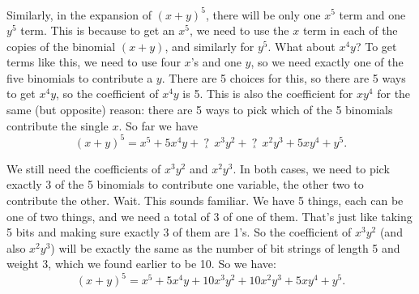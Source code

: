 \documentclass[10pt,]{book}
\theoremstyle{plain}
\theoremstyle{definition}
\theoremstyle{definition}
\theoremstyle{definition}
\numberwithin{equation}{chapter}
\begin{document}
        Similarly, in the expansion of \((x+y)^5\), there will be only one \(x^5\) term and one \(y^5\) term. This is because to get an \(x^5\), we need to use the \(x\) term in each of the copies of the binomial \((x+y)\), and similarly for \(y^5\). What about \(x^4y\)? To get terms like this, we need to use four \(x\)'s and one \(y\), so we need exactly one of the five binomials to contribute a \(y\). There are 5 choices for this, so there are 5 ways to get \(x^4y\), so the coefficient of \(x^4y\) is 5. This is also the coefficient for \(xy^4\) for the same (but opposite) reason: there are 5 ways to pick which of the 5 binomials contribute the single \(x\). So far we have
        \begin{equation*}
          (x+y)^5 = x^5 + 5x^4y + \underline{~?~}~x^3y^2 + \underline{~?~}~x^2y^3 + 5 xy^4 + y^5.
        \end{equation*}
\par

        We still need the coefficients of \(x^3y^2\) and \(x^2y^3\). In both cases, we need to pick exactly 3 of the 5 binomials to contribute one variable, the other two to contribute the other. Wait. This sounds familiar. We have 5 things, each can be one of two things, and we need a total of 3 of one of them. That's just like taking 5 bits and making sure exactly 3 of them are 1's. So the coefficient of \(x^3y^2\) (and also \(x^2y^3\)) will be exactly the same as the number of bit strings of length 5 and weight 3, which we found earlier to be 10. So we have:
        \begin{equation*}
          (x+y)^5 = x^5 + 5x^4y + 10x^3y^2 + 10x^2y^3 + 5 xy^4 + y^5.
        \end{equation*}
\par
\end{document}
